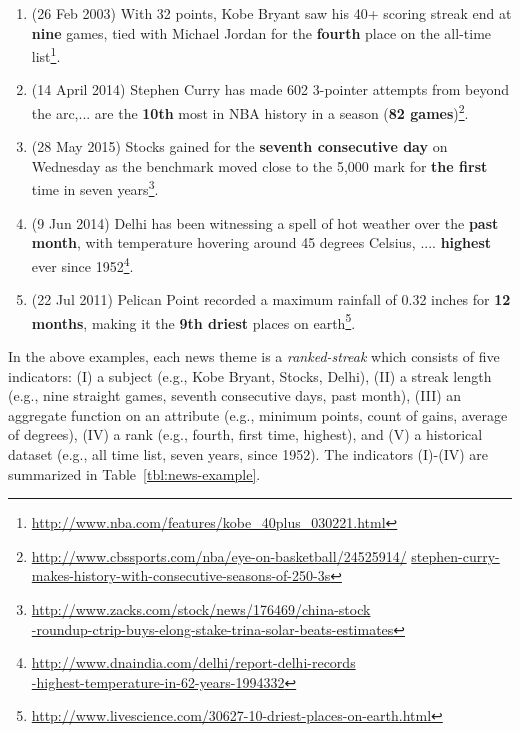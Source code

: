 \begin{enumerate}
\item{(26 Feb 2003) With 32 points, Kobe Bryant saw his 40+ scoring streak end at \textbf{nine} games, tied with Michael Jordan for the \textbf{fourth} place on the all-time list\footnote{\url{http://www.nba.com/features/kobe_40plus_030221.html}}.} 

\item{(14 April 2014) Stephen Curry has made 602 3-pointer attempts from beyond the arc,... are the \textbf{10th} most in NBA history in a season (\textbf{82 games})\footnote{\url{http://www.cbssports.com/nba/eye-on-basketball/24525914/} \url{stephen-curry-makes-history-with-consecutive-seasons-of-250-3s}}.}

\item{(28 May 2015) Stocks gained for the \textbf{seventh consecutive day} on Wednesday as the benchmark moved close to the 5,000 mark for \textbf{the first} time in seven years\footnote{\url{http://www.zacks.com/stock/news/176469/china-stock} \\ \url{-roundup-ctrip-buys-elong-stake-trina-solar-beats-estimates}}.}

\item{(9 Jun 2014) Delhi has been witnessing a spell of hot weather over the \textbf{past month}, with temperature hovering around 45 degrees Celsius, .... \textbf{highest} ever since 1952\footnote{\url{http://www.dnaindia.com/delhi/report-delhi-records} \\ \url{-highest-temperature-in-62-years-1994332}}.}

\item{(22 Jul 2011) Pelican Point recorded a maximum rainfall of 0.32 inches for \textbf{12 months}, making it the  \textbf{9th driest} places on earth\footnote{\url{http://www.livescience.com/30627-10-driest-places-on-earth.html}}.}
\end{enumerate}

In the above examples, each news theme is a \emph{ranked-streak} which consists of five indicators: (I)  a subject (e.g., Kobe Bryant, Stocks, Delhi), (II) a streak length (e.g., nine straight games, seventh consecutive days, past month), (III) an aggregate function on an attribute
(e.g., minimum points, count of gains, average of degrees), (IV) a rank (e.g., fourth, first time, highest), and (V) a historical dataset (e.g., all time list,
seven years, since 1952). The indicators (I)-(IV) are summarized in Table~\ref{tbl:news-example}.
%

